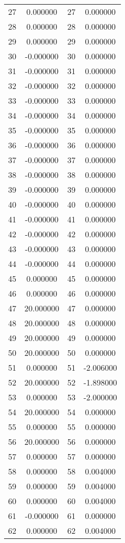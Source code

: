 \documentclass[12pt]{article}
\begin{document}
\begin{longtable}{@{}cccc@{}}
27 & 0.000000 & 27 & 0.000000 \\
28 & 0.000000 & 28 & 0.000000 \\
29 & 0.000000 & 29 & 0.000000 \\
30 & -0.000000 & 30 & 0.000000 \\
31 & -0.000000 & 31 & 0.000000 \\
32 & -0.000000 & 32 & 0.000000 \\
33 & -0.000000 & 33 & 0.000000 \\
34 & -0.000000 & 34 & 0.000000 \\
35 & -0.000000 & 35 & 0.000000 \\
36 & -0.000000 & 36 & 0.000000 \\
37 & -0.000000 & 37 & 0.000000 \\
38 & -0.000000 & 38 & 0.000000 \\
39 & -0.000000 & 39 & 0.000000 \\
40 & -0.000000 & 40 & 0.000000 \\
41 & -0.000000 & 41 & 0.000000 \\
42 & -0.000000 & 42 & 0.000000 \\
43 & -0.000000 & 43 & 0.000000 \\
44 & -0.000000 & 44 & 0.000000 \\
45 & 0.000000 & 45 & 0.000000 \\
46 & 0.000000 & 46 & 0.000000 \\
47 & 20.000000 & 47 & 0.000000 \\
48 & 20.000000 & 48 & 0.000000 \\
49 & 20.000000 & 49 & 0.000000 \\
50 & 20.000000 & 50 & 0.000000 \\
51 & 0.000000 & 51 & -2.006000 \\
52 & 20.000000 & 52 & -1.898000 \\
53 & 0.000000 & 53 & -2.000000 \\
54 & 20.000000 & 54 & 0.000000 \\
55 & 0.000000 & 55 & 0.000000 \\
56 & 20.000000 & 56 & 0.000000 \\
57 & 0.000000 & 57 & 0.000000 \\
58 & 0.000000 & 58 & 0.004000 \\
59 & 0.000000 & 59 & 0.004000 \\
60 & 0.000000 & 60 & 0.004000 \\
61 & -0.000000 & 61 & 0.000000 \\
62 & 0.000000 & 62 & 0.004000 \\

\end{longtable}
\end{document}

